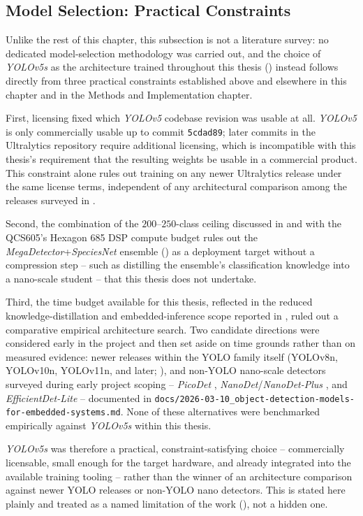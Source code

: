 \subsection{Model Selection: Practical Constraints}\label{sec:model_selection}

Unlike the rest of this chapter, this subsection is not a literature survey: no dedicated model-selection methodology was carried out, and the choice of \textit{YOLOv5s} as the architecture trained throughout this thesis () instead follows directly from three practical constraints established above and elsewhere in this chapter and in the Methods and Implementation chapter.

First, licensing fixed which \textit{YOLOv5} codebase revision was usable at all. \textit{YOLOv5} \cite{jocher_yolov5_2020} is only commercially usable up to commit \texttt{5cdad89}; later commits in the Ultralytics repository require additional licensing, which is incompatible with this thesis's requirement that the resulting weights be usable in a commercial product. This constraint alone rules out training on any newer Ultralytics release under the same license terms, independent of any architectural comparison among the releases surveyed in .

Second, the combination of the $200$--$250$-class ceiling discussed in  and  with the QCS605's Hexagon 685 DSP compute budget rules out the \textit{MegaDetector}+\textit{SpeciesNet} ensemble () as a deployment target without a compression step -- such as distilling the ensemble's classification knowledge into a nano-scale student -- that this thesis does not undertake.

Third, the time budget available for this thesis, reflected in the reduced knowledge-distillation and embedded-inference scope reported in , ruled out a comparative empirical architecture search. Two candidate directions were considered early in the project and then set aside on time grounds rather than on measured evidence: newer releases within the YOLO family itself (YOLOv8n, YOLOv10n, YOLOv11n, and later; ), and non-YOLO nano-scale detectors surveyed during early project scoping -- \textit{PicoDet} \cite{yuPPPicoDetBetterRealTime2021}, \textit{NanoDet}/\textit{NanoDet-Plus} \cite{rangilyuRangiLyuNanodet2026}, and \textit{EfficientDet-Lite} -- documented in \texttt{docs/2026-03-10\_object-detection-models-for-embedded-systems.md}. None of these alternatives were benchmarked empirically against \textit{YOLOv5s} within this thesis.

\textit{YOLOv5s} was therefore a practical, constraint-satisfying choice -- commercially licensable, small enough for the target hardware, and already integrated into the available training tooling -- rather than the winner of an architecture comparison against newer YOLO releases or non-YOLO nano detectors. This is stated here plainly and treated as a named limitation of the work (), not a hidden one.

